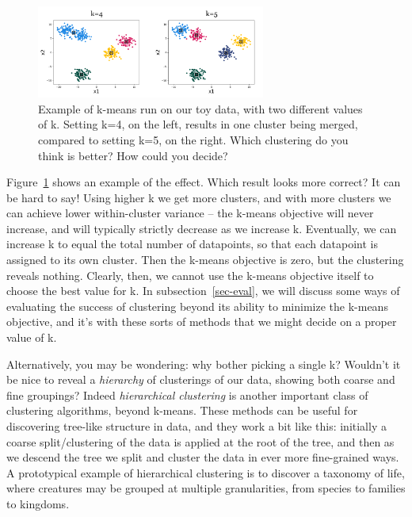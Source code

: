 \begin{figure}[h]
  \centering
  \includegraphics[width=0.67\textwidth]{figures/effect_of_k.png}
  \caption{Example of k-means run on our toy data, with two
    different values of k. Setting k=4, on the left, results in one
    cluster being merged, compared to setting k=5, on the
    right. Which clustering do you think is better? How could you
    decide?}
  \label{fig:effect_of_k}
\end{figure}

Figure~\ref{fig:effect_of_k} shows an example of the effect.  Which
result looks more correct? It can be hard to say! Using higher k we
get more clusters, and with more clusters we can achieve lower
within-cluster variance -- the k-means objective will never increase,
and will typically strictly decrease as we increase k. Eventually, we
can increase k to equal the total number of datapoints, so that each
datapoint is assigned to its own cluster. Then the k-means objective
is zero, but the clustering reveals nothing.  Clearly, then, we cannot
use the k-means objective itself to choose the best value for k. In subsection~\ref{sec-eval}, we will discuss some ways of evaluating the
success of clustering beyond its ability to minimize the k-means
objective, and it's with these sorts of methods that we might decide
on a proper value of k.

Alternatively, you may be wondering: why bother picking a single k?
Wouldn't it be nice to reveal a \textit{hierarchy} of clusterings of
our data, showing both coarse and fine groupings? Indeed
\textit{hierarchical clustering}  is another important class of
clustering algorithms, beyond k-means. These methods can be useful for
discovering tree-like structure in data, and they work a bit like this: initially a coarse
split/clustering of the data is applied at the root of the tree, and then as we
descend the tree we split and cluster the data in ever more fine-grained ways. A
prototypical example of hierarchical clustering is to discover a
taxonomy of life, where creatures may be grouped at multiple
granularities, from species to families to kingdoms.


